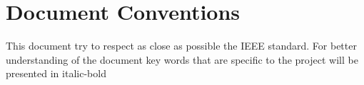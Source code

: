 \documentclass{scrreprt}
\begin{document}
\section{Document Conventions}

This document try to respect as close as possible the IEEE standard.
For better understanding of the document key words that are specific to the
project will be presented in italic-bold





\end{document}
